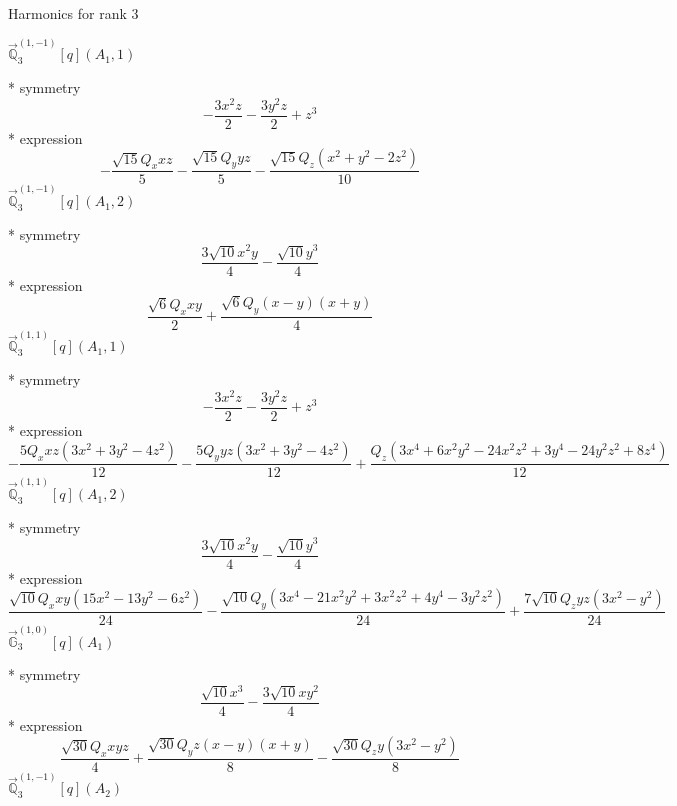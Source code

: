 \documentclass[fleqn,8pt]{jsarticle}
\begin{document}
\noindent * Harmonics for rank 3

\noindent\quad $\vec{\mathbb{Q}}_{3}^{(1,-1)}[q](A_{1},1)$

\noindent\quad ** symmetry
\begin{dmath*}
- \frac{3 x^{2} z}{2} - \frac{3 y^{2} z}{2} + z^{3}
\end{dmath*}
\noindent\quad ** expression
\begin{dmath*}
- \frac{\sqrt{15} Q_{x} x z}{5} - \frac{\sqrt{15} Q_{y} y z}{5} - \frac{\sqrt{15} Q_{z} \left(x^{2} + y^{2} - 2 z^{2}\right)}{10}
\end{dmath*}
\noindent\quad $\vec{\mathbb{Q}}_{3}^{(1,-1)}[q](A_{1},2)$

\noindent\quad ** symmetry
\begin{dmath*}
\frac{3 \sqrt{10} x^{2} y}{4} - \frac{\sqrt{10} y^{3}}{4}
\end{dmath*}
\noindent\quad ** expression
\begin{dmath*}
\frac{\sqrt{6} Q_{x} x y}{2} + \frac{\sqrt{6} Q_{y} \left(x - y\right) \left(x + y\right)}{4}
\end{dmath*}
\noindent\quad $\vec{\mathbb{Q}}_{3}^{(1,1)}[q](A_{1},1)$

\noindent\quad ** symmetry
\begin{dmath*}
- \frac{3 x^{2} z}{2} - \frac{3 y^{2} z}{2} + z^{3}
\end{dmath*}
\noindent\quad ** expression
\begin{dmath*}
- \frac{5 Q_{x} x z \left(3 x^{2} + 3 y^{2} - 4 z^{2}\right)}{12} - \frac{5 Q_{y} y z \left(3 x^{2} + 3 y^{2} - 4 z^{2}\right)}{12} + \frac{Q_{z} \left(3 x^{4} + 6 x^{2} y^{2} - 24 x^{2} z^{2} + 3 y^{4} - 24 y^{2} z^{2} + 8 z^{4}\right)}{12}
\end{dmath*}
\noindent\quad $\vec{\mathbb{Q}}_{3}^{(1,1)}[q](A_{1},2)$

\noindent\quad ** symmetry
\begin{dmath*}
\frac{3 \sqrt{10} x^{2} y}{4} - \frac{\sqrt{10} y^{3}}{4}
\end{dmath*}
\noindent\quad ** expression
\begin{dmath*}
\frac{\sqrt{10} Q_{x} x y \left(15 x^{2} - 13 y^{2} - 6 z^{2}\right)}{24} - \frac{\sqrt{10} Q_{y} \left(3 x^{4} - 21 x^{2} y^{2} + 3 x^{2} z^{2} + 4 y^{4} - 3 y^{2} z^{2}\right)}{24} + \frac{7 \sqrt{10} Q_{z} y z \left(3 x^{2} - y^{2}\right)}{24}
\end{dmath*}
\noindent\quad $\vec{\mathbb{G}}_{3}^{(1,0)}[q](A_{1})$

\noindent\quad ** symmetry
\begin{dmath*}
\frac{\sqrt{10} x^{3}}{4} - \frac{3 \sqrt{10} x y^{2}}{4}
\end{dmath*}
\noindent\quad ** expression
\begin{dmath*}
\frac{\sqrt{30} Q_{x} x y z}{4} + \frac{\sqrt{30} Q_{y} z \left(x - y\right) \left(x + y\right)}{8} - \frac{\sqrt{30} Q_{z} y \left(3 x^{2} - y^{2}\right)}{8}
\end{dmath*}
\noindent\quad $\vec{\mathbb{Q}}_{3}^{(1,-1)}[q](A_{2})$
\end{document}
